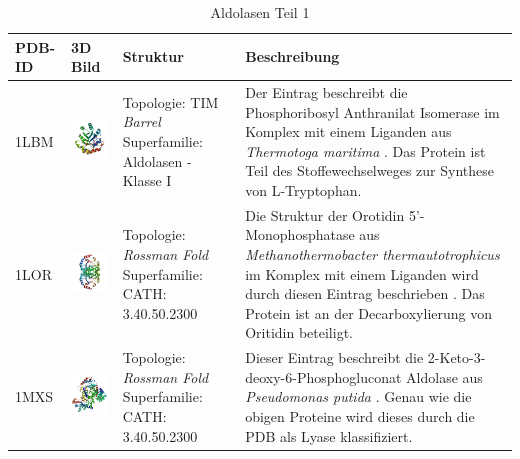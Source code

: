 \documentclass{article}
\begin{document}
\begin{table}
\begin{center}
\caption{Aldolasen Teil 1}
\begin{tabular}{ | C{9mm} | C{30mm} | C{29mm} | C{38mm} | }
\hline
PDB-ID & 3D Bild & Struktur & Beschreibung \\ \hline
1LBM  & \includegraphics[width=30mm, trim= -10 -5 -5 -10]{1LBM_bio_r_500.jpg} & Topologie: \newline TIM \textit{Barrel} \newline Superfamilie: Aldolasen - Klasse I & Der Eintrag beschreibt die Phosphoribosyl Anthranilat Isomerase im Komplex mit einem Liganden aus \textit{Thermotoga maritima} \cite{1lbm}. Das Protein ist Teil des Stoffewechselweges zur Synthese von L-Tryptophan. \\ \hline
1LOR  & \includegraphics[width=30mm, trim= -10 -5 -5 -10]{1LOR_bio_r_500.jpg} & Topologie: \newline \textit{\textit{Rossman Fold}} \newline Superfamilie: CATH: 3.40.50.2300  & Die Struktur der Orotidin 5'-Monophosphatase aus \textit{Methanothermobacter thermautotrophicus} im Komplex mit einem Liganden wird durch diesen Eintrag beschrieben \cite{1lor}. Das Protein ist an der Decarboxylierung von Oritidin beteiligt. \\ \hline
1MXS  & \includegraphics[width=30mm, trim= -10 -5 -5 -10]{1MXS_bio_r_500.jpg} & Topologie: \newline \textit{\textit{Rossman Fold}} \newline Superfamilie: CATH: 3.40.50.2300  & Dieser Eintrag beschreibt die 2-Keto-3-deoxy-6-Phosphogluconat Aldolase aus \textit{Pseudomonas putida} \cite{1mxs}. Genau wie die obigen Proteine wird dieses durch die PDB als Lyase klassifiziert. \\ \hline

\end{tabular}
\end{center}
\end{table}
\end{document}
